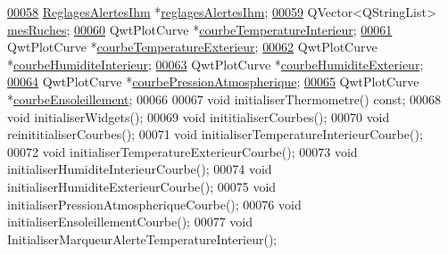 \begin{DoxyCode}
\hyperlink{class_ruche_ihm_a04068fbec978c2443f3baf08d4945929}{00058}     \hyperlink{class_reglages_alertes_ihm}{ReglagesAlertesIhm} *\hyperlink{class_ruche_ihm_a04068fbec978c2443f3baf08d4945929}{reglagesAlertesIhm};  
\hyperlink{class_ruche_ihm_ab7741fa67b19cbb2da7eb12c58cf83c1}{00059}     QVector<QStringList> \hyperlink{class_ruche_ihm_ab7741fa67b19cbb2da7eb12c58cf83c1}{mesRuches};  
\hyperlink{class_ruche_ihm_a6ce372c8df13bb78c09705432dcfcf58}{00060}     QwtPlotCurve *\hyperlink{class_ruche_ihm_a6ce372c8df13bb78c09705432dcfcf58}{courbeTemperatureInterieur};
\hyperlink{class_ruche_ihm_a68e72873a859840d3c91b147b8559118}{00061}     QwtPlotCurve *\hyperlink{class_ruche_ihm_a68e72873a859840d3c91b147b8559118}{courbeTemperatureExterieur};
\hyperlink{class_ruche_ihm_a19a58f5841dc91eb7f84acd419f35678}{00062}     QwtPlotCurve *\hyperlink{class_ruche_ihm_a19a58f5841dc91eb7f84acd419f35678}{courbeHumiditeInterieur};
\hyperlink{class_ruche_ihm_a0c9d769a392e3c1332f8908cd9d558eb}{00063}     QwtPlotCurve *\hyperlink{class_ruche_ihm_a0c9d769a392e3c1332f8908cd9d558eb}{courbeHumiditeExterieur};
\hyperlink{class_ruche_ihm_aa6685f1fc20aa4459eab3b0bb3c4d1ef}{00064}     QwtPlotCurve *\hyperlink{class_ruche_ihm_aa6685f1fc20aa4459eab3b0bb3c4d1ef}{courbePressionAtmospherique};
\hyperlink{class_ruche_ihm_af160181f408b3a9519b97e67c810a0fd}{00065}     QwtPlotCurve *\hyperlink{class_ruche_ihm_af160181f408b3a9519b97e67c810a0fd}{courbeEnsoleillement};
00066 
00067     \textcolor{keywordtype}{void} initialiserThermometre() \textcolor{keyword}{const};
00068     \textcolor{keywordtype}{void} initialiserWidgets();
00069     \textcolor{keywordtype}{void} inititialiserCourbes();
00070     \textcolor{keywordtype}{void} reinititialiserCourbes();
00071     \textcolor{keywordtype}{void} initialiserTemperatureInterieurCourbe();
00072     \textcolor{keywordtype}{void} initialiserTemperatureExterieurCourbe();
00073     \textcolor{keywordtype}{void} initialiserHumiditeInterieurCourbe();
00074     \textcolor{keywordtype}{void} initialiserHumiditeExterieurCourbe();
00075     \textcolor{keywordtype}{void} initialiserPressionAtmospheriqueCourbe();
00076     \textcolor{keywordtype}{void} initialiserEnsoleillementCourbe();
00077     \textcolor{keywordtype}{void} InitialiserMarqueurAlerteTemperatureInterieur();

\end{DoxyCode}
